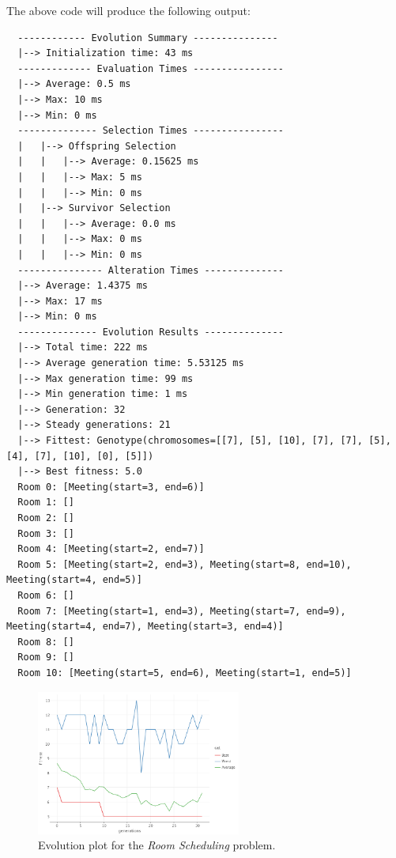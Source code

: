 The above code will produce the following output:

\begin{verbatim}
  ------------ Evolution Summary ---------------
  |--> Initialization time: 43 ms
  ------------- Evaluation Times ----------------
  |--> Average: 0.5 ms
  |--> Max: 10 ms
  |--> Min: 0 ms
  -------------- Selection Times ----------------
  |   |--> Offspring Selection
  |   |   |--> Average: 0.15625 ms
  |   |   |--> Max: 5 ms
  |   |   |--> Min: 0 ms
  |   |--> Survivor Selection
  |   |   |--> Average: 0.0 ms
  |   |   |--> Max: 0 ms
  |   |   |--> Min: 0 ms
  --------------- Alteration Times --------------
  |--> Average: 1.4375 ms
  |--> Max: 17 ms
  |--> Min: 0 ms
  -------------- Evolution Results --------------
  |--> Total time: 222 ms
  |--> Average generation time: 5.53125 ms
  |--> Max generation time: 99 ms
  |--> Min generation time: 1 ms
  |--> Generation: 32
  |--> Steady generations: 21
  |--> Fittest: Genotype(chromosomes=[[7], [5], [10], [7], [7], [5], [4], [7], [10], [0], [5]])
  |--> Best fitness: 5.0
  Room 0: [Meeting(start=3, end=6)]
  Room 1: []
  Room 2: []
  Room 3: []
  Room 4: [Meeting(start=2, end=7)]
  Room 5: [Meeting(start=2, end=3), Meeting(start=8, end=10), Meeting(start=4, end=5)]
  Room 6: []
  Room 7: [Meeting(start=1, end=3), Meeting(start=7, end=9), Meeting(start=4, end=7), Meeting(start=3, end=4)]
  Room 8: []
  Room 9: []
  Room 10: [Meeting(start=5, end=6), Meeting(start=1, end=5)]
\end{verbatim}

\begin{figure}[ht!]
  \centering
  \includegraphics[width=0.6\textwidth]{img/java_6eGIGC5z5r.png}
  \caption{Evolution plot for the \textit{Room Scheduling} problem.}
  \label{fig:app:keen_room_scheduling}
\end{figure}
